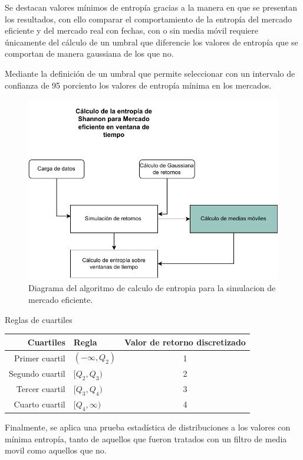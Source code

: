 Se destacan valores mínimos de entropía gracias a la manera en que se presentan los resultados, con ello comparar el comportamiento de la entropía del mercado eficiente y del mercado real con fechas, con o sin media móvil requiere únicamente del cálculo de un umbral que diferencie los valores de entropía que se comportan de manera gaussiana  de los que no.

Mediante la definición de un umbral que permite seleccionar con un intervalo de confianza de 95 porciento los valores de entropía mínima en los mercados. 

\begin{figure}
	\centering
	\includegraphics[width=0.9\linewidth]{figures/simulacion}
	\caption{Diagrama del algoritmo de calculo de entropia para la simulacion de mercado eficiente. }
	\label{simulacion}
\end{figure}

Reglas de cuartiles
\begin{center}
	\begin{tabular}{ |r | l | c| }
		 \hline
		Cuartiles & Regla & Valor de retorno discretizado \\ \hline
		Primer cuartil & $(-\infty , Q_2)$ & 1 \\
		Segundo cuartil & $[Q_2 , Q_3)$   & 2\\ 
		Tercer cuartil &  $[Q_3 , Q_4)$   & 3 \\
		Cuarto cuartil & $[Q_4 , \infty)$ &4\\ 
		 \hline
	\end{tabular}
\end{center}



Finalmente, se aplica una prueba estadística de distribuciones a los valores con mínima entropía, tanto de aquellos que fueron tratados con un filtro de media movil como aquellos que no. 


